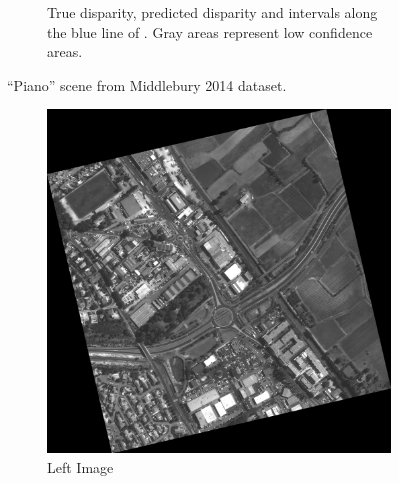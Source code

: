 \begin{figure}
\begin{subfigure}[t]{1\linewidth}
        \caption{True disparity, predicted disparity and intervals along the blue line of . Gray areas represent low confidence areas.}
        \label{fig:piano_c}
    \end{subfigure}
    \caption{``Piano'' scene from Middlebury 2014 dataset.}
    \label{fig:piano}
\end{figure}

\begin{figure}
    \centering
    \begin{subfigure}[t]{0.5\linewidth}
        \centering
        \includegraphics[width=\linewidth]{Images/Chap_5/MTP_291.png}
        \caption{Left Image}
        \label{fig:mtp_291_a}
    \end{subfigure}\hfill
    \begin{subfigure}[t]{0.5\linewidth}
        \centering

\end{subfigure}
\end{figure}
